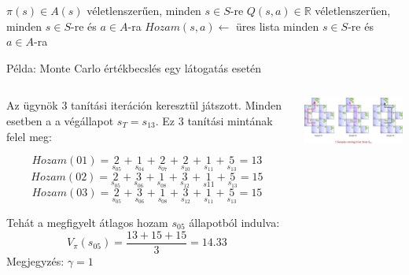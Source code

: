 \documentclass[english, aspectratio=169]{beamer}
\begin{document}
\begin{frame}{}
\begin{algorithm}[H]
\caption{Monte Carlo becslés $\pi_{*}$ keresésére}
\SetAlgoLined
\begin{small}
$\pi(s) \in A(s)$ véletlenszerűen, minden $s \in S$-re\;
$Q(s,a) \in \mathbb{R}$ véletlenszerűen, minden $s \in S$-re és $a \in A$-ra\;
$Hozam(s,a) \leftarrow$ üres lista minden $s \in S$-re és $a \in A$-ra\;
\end{small}
\end{algorithm}
\end{frame}

\begin{frame}{Példa: Monte Carlo értékbecslés egy látogatás esetén}
\begin{columns} %
\begin{column}{.5\textwidth}
Az ügynök 3 tanítási iteráción keresztül játszott. Minden esetben a a végállapot $s_T=s_{13}$. Ez 3 tanítási mintának felel meg:
\begin{scriptsize}
\[
Hozam(01) = \underset{s_{05}}{2}+\underset{s_{04}}{1}+\underset{s_{07}}{2}+\underset{s_{10}}{2}+\underset{s_{11}}{1}+\underset{s_{13}}{5}=13
\]
\[
Hozam(02) = \underset{s_{05}}{2}+\underset{s_{06}}{3}+\underset{s_{08}}{1}+\underset{s_{12}}{3}+\underset{s{11}}{1}+\underset{s_{13}}{5}=15
\]
\[
Hozam(03) = \underset{s_{05}}{2}+\underset{s_{06}}{3}+\underset{s_{08}}{1}+\underset{s_{12}}{3}+\underset{s_{11}}{1}+\underset{s_{13}}{5}=15
\]
\end{scriptsize}
Tehát a megfigyelt átlagos hozam $s_{05}$ állapotból indulva: 
\[
V_\pi(s_{05})=\frac{13+15+15}{3}=14.33
\]
Megjegyzés: $\gamma=1$
\end{column}
\begin{column}{.5\textwidth}
\begin{center}
\includegraphics[width=7cm, keepaspectratio]{images/mc_td_12.png}
\end{center}
\end{column}
\end{columns}
\end{frame}
\end{document}
